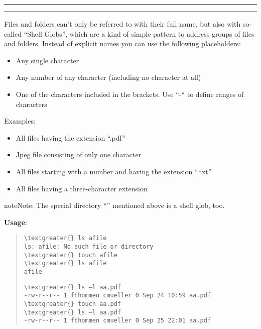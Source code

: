 \documentclass[letterpaper,10pt,english]{sphinxmanual}
\begin{document}
\bigskip\hrule{}\bigskip

\begin{figure}[htbp]
\centering

\end{figure}


\bigskip\hrule{}\bigskip


Files and folders can’t only be referred to with their full name, but also with so-called “Shell Globs”, which are a kind of simple pattern to address groups of files and folders.  Instead of explicit names you can use the following placeholders:
\begin{itemize}
\item {} 
  Any single character

\item {} 
\code{*:}  Any number of any character (including no character at all)

\item {} 
\code{{[}...{]}:}    One of the characters included in the brackets.  Use “-“ to define ranges  of characters

\end{itemize}

Examples:
\begin{itemize}
\item {} 
  All files having the extension “.pdf”

\item {} 
  Jpeg file consisting of only one character

\item {} 
 All files starting with a number and having the extension “.txt”

\item {} 
  All files having a three-character extension

\end{itemize}

\begin{notice}{note}{Note:}
The special directory “\code{\textasciitilde{}}” mentioned above is a shell glob, too.
\end{notice}

\textbf{Usage}:  
\begin{quote}

\begin{Verbatim}[commandchars=\\\{\}]
\textgreater{} ls afile
ls: afile: No such file or directory
\textgreater{} touch afile
\textgreater{} ls afile
afile
\end{Verbatim}

\begin{Verbatim}[commandchars=\\\{\}]
\textgreater{} ls –l aa.pdf
-rw-r--r-- 1 fthommen cmueller 0 Sep 24 10:59 aa.pdf
\textgreater{} touch aa.pdf
\textgreater{} ls –l aa.pdf
-rw-r--r-- 1 fthommen cmueller 0 Sep 25 22:01 aa.pdf
\end{Verbatim}
\end{quote}
\end{document}
